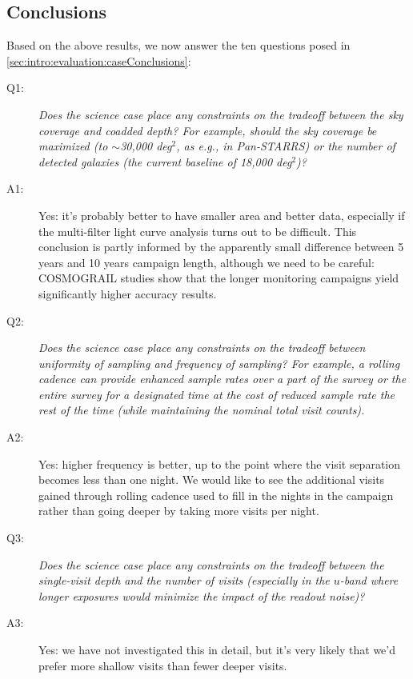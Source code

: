 \subsection{Conclusions}

Based on the above results, we now answer the ten questions posed in
\autoref{sec:intro:evaluation:caseConclusions}:

\begin{description}

\item[Q1:] {\it Does the science case place any constraints on the
tradeoff between the sky coverage and coadded depth? For example, should
the sky coverage be maximized (to $\sim$30,000 deg$^2$, as e.g., in
Pan-STARRS) or the number of detected galaxies (the current baseline
of 18,000 deg$^2$)?}

\item[A1:] Yes: it's probably better to have smaller area and better
data, especially if the multi-filter light curve analysis turns out to
be difficult. This conclusion is partly informed by the apparently small
difference between 5 years and 10 years campaign length, although we
need to be careful: COSMOGRAIL studies show that the longer monitoring
campaigns yield significantly higher accuracy results.

\item[Q2:] {\it Does the science case place any constraints on the
tradeoff between uniformity of sampling and frequency of sampling? For
example, a rolling cadence can provide enhanced sample rates over a part
of the survey or the entire survey for a designated time at the cost of
reduced sample rate the rest of the time (while maintaining the nominal
total visit counts).}

\item[A2:] Yes: higher frequency is better, up to the point where the
visit separation becomes less than one night. We would like to see the
additional visits gained through rolling cadence used to fill in the
nights in the campaign rather than going deeper by taking more visits
per night.

\item[Q3:] {\it Does the science case place any constraints on the
tradeoff between the single-visit depth and the number of visits
(especially in the $u$-band where longer exposures would minimize the
impact of the readout noise)?}

\item[A3:] Yes: we have not investigated this in detail, but it's very
likely that we'd prefer more shallow visits than fewer deeper visits.


\end{description}

